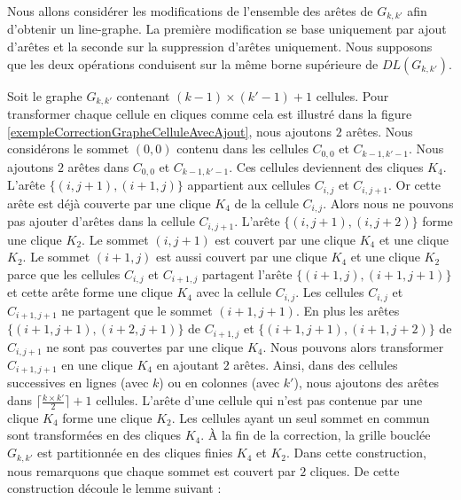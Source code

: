 Nous allons consid\'erer les modifications de l'ensemble des ar\^etes de $G_{k,k'}$ afin d'obtenir un line-graphe. 
La premi\`ere modification  se base uniquement par ajout d'ar\^etes et la seconde sur la suppression d'ar\^etes uniquement. 
Nous supposons que les deux op\'erations conduisent sur la m\^eme borne sup\'erieure de $DL(G_{k,k'})$.

Soit le graphe $G_{k,k'}$ contenant $(k -1) \times (k'-1) + 1$ cellules.
Pour transformer chaque cellule en cliques comme cela est illustr\'e dans la figure \ref{exempleCorrectionGrapheCelluleAvecAjout}, nous ajoutons $2$ ar\^etes.
Nous consid\'erons le sommet $(0,0)$ contenu dans les cellules $C_{0,0}$ et $C_{k-1,k'-1}$.
Nous ajoutons $2$ ar\^etes dans $C_{0,0}$ et $C_{k-1,k'-1}$. Ces cellules deviennent des cliques $K_4$. 
\newline
L'ar\^ete $\{(i,j+1),(i+1,j)\}$ appartient aux cellules  $C_{i,j}$ et  $C_{i,j+1}$.
Or cette ar\^ete est d\'ej\`a couverte par une clique $K_4$ de la cellule $C_{i,j}$.
Alors nous ne pouvons pas ajouter d'ar\^etes dans la cellule $C_{i,j+1}$.
 L'ar\^ete $\{(i,j+1),(i,j+2)\}$ forme une clique $K_2$.
 Le sommet $(i,j+1)$ est couvert par une clique $K_4$ et une clique $K_2$. 
Le sommet $(i+1,j)$ est aussi couvert par une clique $K_4$ et une clique $K_2$ parce que les cellules $C_{i,j}$ et  $C_{i+1,j}$ partagent l'ar\^ete $\{(i+1,j),(i+1,j+1)\}$  et cette ar\^ete forme une clique $K_4$ avec la cellule $C_{i,j}$.
Les cellules $C_{i,j}$ et  $C_{i+1,j+1}$ ne partagent que le sommet  $(i+1,j+1)$. En plus les ar\^etes  $\{(i+1,j+1),(i+2,j+1)\}$ de  $C_{i+1,j}$ et  $\{(i+1,j+1),(i+1,j+2)\}$ de $C_{i,j+1}$ ne sont pas couvertes par une clique $K_4$. Nous pouvons alors transformer $C_{i+1,j+1}$ en une clique $K_4$  en ajoutant $2$ ar\^etes.
\newline
Ainsi, dans des cellules successives en lignes (avec $k$) ou en colonnes (avec $k'$), nous ajoutons des ar\^etes dans $\lceil \frac{k \times k'}{2} \rceil  + 1$ cellules. 
L'ar\^ete  d'une cellule qui n'est pas contenue par une clique $K_4$ forme une clique $K_2$.
Les cellules ayant un seul sommet en commun sont transform\'ees en des cliques $K_4$. 
\newline
\`A la fin  de la correction, la grille boucl\'ee $G_{k,k'}$ est partitionn\'ee en des cliques finies $K_4$ et $K_2$.
Dans cette construction, nous remarquons que chaque sommet est couvert par $2$ cliques. De cette construction d\'ecoule le lemme suivant :

